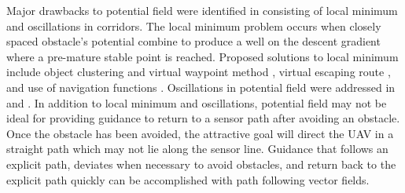 \documentclass[conf]{new-aiaa}
\begin{document}
%

%
%






Major drawbacks to potential field were identified in \cite{koren_potential_1991} consisting of local minimum and oscillations in corridors. The local minimum problem occurs when closely spaced obstacle's potential combine to produce a well on the descent gradient where a pre-mature stable point is reached. Proposed solutions to local minimum include object clustering and virtual waypoint method \cite{liu_virtual-waypoint_2016}, virtual escaping route \cite{kim_escaping_2009}, and use of navigation functions \cite{goerzen_survey_2010}. Oscillations in potential field were addressed in \cite{lei_tang_novel_2010} and \cite{li_efficient_2012}. In addition to local minimum and oscillations, potential field may not be ideal for providing guidance to return to a sensor path after avoiding an obstacle. Once the obstacle has been avoided, the attractive goal will direct the UAV in a straight path which may not lie along the sensor line. Guidance that follows an explicit path, deviates when necessary to avoid obstacles, and return back to the explicit path quickly can be accomplished with path following vector fields.  \\
\end{document}
